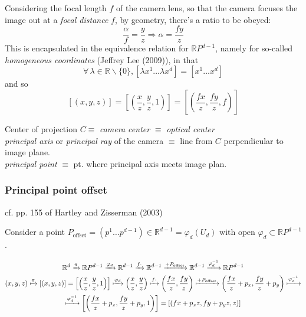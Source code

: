 \documentclass[10pt]{amsart}
\begin{document}
\begin{multicols*}{2}
Considering the focal length $f$ of the camera lens, so that the camera focuses the image out at a \emph{focal distance} $f$, by geometry, there's a ratio to be obeyed:
\[
\frac{\alpha}{f} = \frac{y}{z} \Longrightarrow \alpha = \frac{fy}{z}
\]
This is encapsulated in the equivalence relation for $\mathbb{R}P^{d-1}$, namely for so-called \emph{homogeneous coordinates} (Jeffrey Lee (2009)), in that 
\[
\forall \, \lambda \in \mathbb{R} \backslash \lbrace 0 \rbrace , [\lambda x^1 \dots \lambda x^d] = [x^1 \dots x^d] 
\]
and so 
\[
[(x,y,z) ] = [ \left( \frac{x}{z} , \frac{y}{z} , 1 \right) ] = \left[ \left( \frac{fx}{z}, \frac{fy}{z} , f \right) \right]
\]

Center of projection $C \equiv $ \emph{camera center} $\equiv$ \emph{optical center}  \\
\emph{principal axis} or \emph{principal ray} of the camera $\equiv$ line from $C$ perpendicular to image plane.  \\
\emph{principal point} $\equiv $ pt. where principal axis meets image plan.  

\subsubsection{Principal point offset} cf. pp. 155 of Hartley and Zisserman (2003) \cite{HaZi2003}

Consider a point $P_{\text{offset}} = (p^1 \dots p^{d-1}) \in \mathbb{R}^{d-1} = \varphi_d(U_d) \text{ with open } \varphi_d \subset \mathbb{R}P^{d-1}$.  

\begin{equation}
\begin{gathered}
	\mathbb{R}^d \xrightarrow{ \pi } \mathbb{R}P^{d-1} \xrightarrow{ \varphi_d  } \mathbb{R}^{d-1}  \xrightarrow{ f\cdot } \mathbb{R}^{d-1} \xrightarrow{ + P_{\text{offset}} } \mathbb{R}^{d-1} \xrightarrow{ \varphi_d^{-1} } \mathbb{R}P^{d-1}  \\
\begin{gathered}
(x,y,z) \xmapsto{ \pi } [(x,y,z)] = \left[ \left( \frac{x}{z}, \frac{y}{z},1 \right) \right] \xmapsto{ \varphi_d }  \left( \frac{x}{z} , \frac{y}{z} \right) \xmapsto{ f\cdot } \left( \frac{fx}{z} , \frac{fy}{z} \right) \xmapsto{ + P_{\text{offset}} } \left( \frac{fx}{z} + p_x,  \frac{fy}{z} + p_y \right) \xmapsto{ \varphi_d^{-1}} \\
 \xmapsto{ \varphi_d^{-1}} \left[ \left( \frac{fx}{z} + p_x , \frac{fy}{z} + p_y ,1\right) \right] = \left[ (fx+p_xz, fy+p_yz, z) \right]
\end{gathered}
\end{gathered}
\end{equation}


\end{multicols*}
\end{document}
